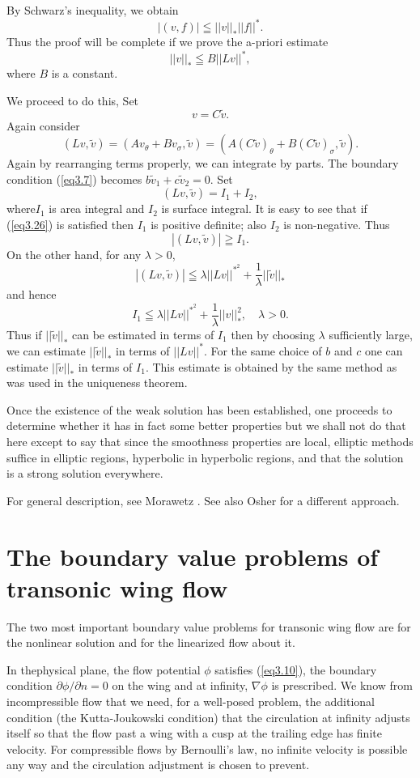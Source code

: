 \medskip
{}
By Schwarz's inequality, we obtain
$$
|(v,f)| \leqq ||v||_* ||f||^*.
$$
Thus the proof will be complete if we prove the a-priori estimate
$$
||v||_* \leqq B||Lv||^*,
$$
where $B$ is a constant.

We proceed to do this, Set
\begin{equation*}
v = C \tilde{v}.   \tag{3.28}\label{eq3.28}
\end{equation*}
Again consider 
$$
(Lv, \tilde{v}) = (Av_\theta + Bv_\sigma, \tilde{v}) = (A(C\tilde{v})_\theta + B(C \tilde{v})_\sigma, \tilde{v}).
$$
Again by rearranging terms properly, we can integrate by parts. The boundary condition (\ref{eq3.7}) becomes $b\tilde{v}_1+ c \tilde{v}_2 =0 $. Set
$$
(Lv, \tilde{v}) = I_1 + I_2,
$$
where\pageoriginale $I_1$ is area integral and $I_2$ is surface integral. It is easy to see that if (\ref{eq3.26}) is satisfied then $I_1$ is positive definite; also $I_2$ is non-negative. Thus 
$$
|(Lv, \tilde{v})| \geqq I_1. 
$$
On the other hand, for any $\lambda > 0$,
$$
|(Lv, \tilde{v})| \leqq \lambda ||Lv||^{*^2} + \frac{1}{\lambda}||\tilde{v}||_*
$$
and hence
$$
I_1 \leqq \lambda || Lv||^{*^2} + \frac{1}{\lambda} ||v||^2_*, \quad \lambda > 0.
$$
Thus if $||\tilde{v}||_*$ can be estimated in terms of $I_1$ then by choosing $\lambda$ sufficiently large, we can estimate $||\tilde{v}||_*$ in terms of $||Lv||^*$. For the same choice of $b$ and $c$ one can estimate $||\tilde{v}||_*$ in terms of $I_1$. This estimate is obtained by the same method as was used in the uniqueness theorem.

Once the existence of the weak solution has been established, one proceeds to determine whether it has in fact some better properties but we shall not do that here except to say that since the smoothness properties are local, elliptic methods suffice in elliptic regions, hyperbolic in hyperbolic regions, and that the solution is a strong solution everywhere.

For general description, see Morawetz \cite{key30}. See also Osher \cite{key35} for a different approach.

\section{The boundary value problems of transonic wing flow}\label{chap3:sec3.9}
The two most important boundary value problems for transonic wing flow are for the nonlinear solution and for the linearized flow about it.

In the\pageoriginale physical plane, the flow potential $\phi$ satisfies (\ref{eq3.10}), the boundary condition $\partial \phi / \partial n=0$ on the wing and at infinity, $\nabla \phi$ is prescribed. We know from incompressible flow that we need, for a well-posed problem, the additional condition (the Kutta-Joukowski condition) that the circulation at infinity adjusts itself so that the flow past a wing with a cusp at the trailing edge has finite velocity. For compressible flows by Bernoulli's law, no infinite velocity is possible any way and the circulation adjustment is chosen to prevent.


